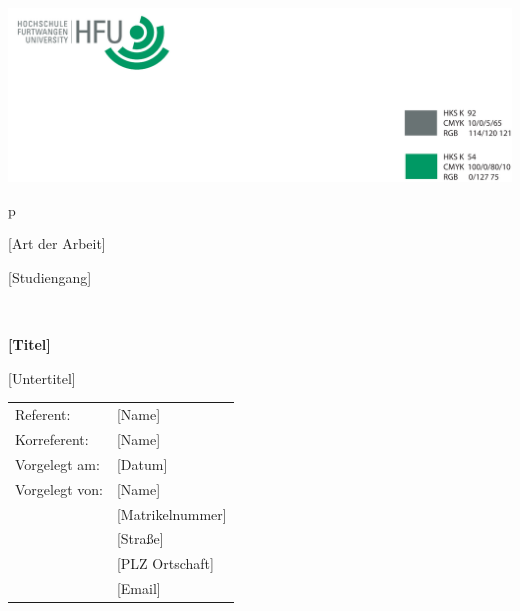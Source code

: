 \thispagestyle{empty}
\begin{titlepage}
    \hfill \includegraphics[scale=0.8]{1_Titelseite/LogoHFU.pdf}\\
    \begin{tabular}{p{\textwidth}}
        \begin{center}
            \LARGE{[Art der Arbeit]}
        \end{center}
        
        \begin{center}
            \LARGE{[Studiengang]}
        \end{center}
        \\
        \begin{center}
            \textbf{\Huge{[Titel]}}
        \end{center}

        \begin{center}
            \LARGE{[Untertitel]}
        \end{center}
        
        \begin{minipage}{\textwidth}
            \vskip 8cm
            {\normalsize}
            \begin{center}
                \begin{tabular}{ll}
                    Referent: & [Name]   \tabularnewline
                    Korreferent:& [Name]   \tabularnewline
                    Vorgelegt am:& [Datum]   \tabularnewline
                    Vorgelegt von:& [Name] \tabularnewline
                        & [Matrikelnummer]   \tabularnewline
                        & [Straße]   \tabularnewline
                        & [PLZ Ortschaft]   \tabularnewline
                        & [Email]    \tabularnewline
                \end{tabular}
            \end{center}
            {\normalsize}
        \end{minipage}
    \end{tabular}
\end{titlepage}
\restoregeometry        %
